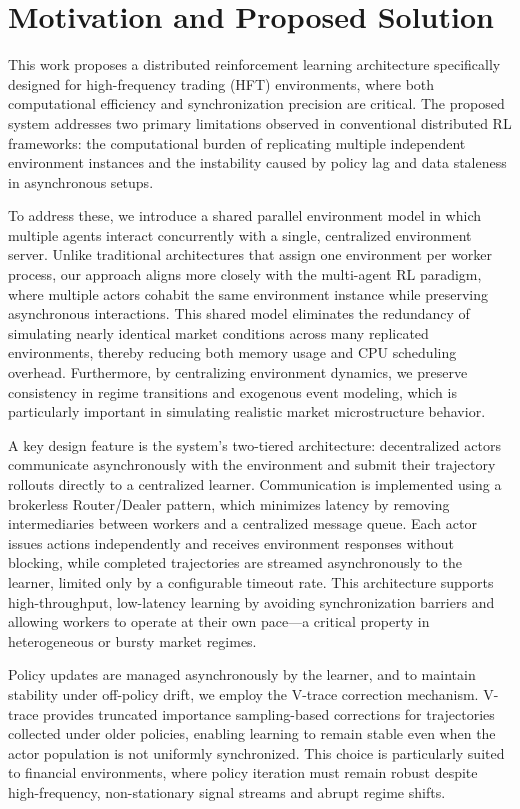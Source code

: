 \section{Motivation and Proposed Solution}
\label{sec:motivation}

This work proposes a distributed reinforcement learning architecture specifically designed for high-frequency trading (HFT) environments,
where both computational efficiency and synchronization precision are critical.
The proposed system addresses two primary limitations observed in conventional distributed RL frameworks:
the computational burden of replicating multiple independent environment instances and the instability caused by
policy lag and data staleness in asynchronous setups.

To address these, we introduce a shared parallel environment model in which multiple agents interact concurrently with a single,
centralized environment server.
Unlike traditional architectures that assign one environment per worker process, our approach aligns more closely with the multi-agent RL paradigm,
where multiple actors cohabit the same environment instance while preserving asynchronous interactions.
This shared model eliminates the redundancy of simulating nearly identical market conditions across many replicated environments,
thereby reducing both memory usage and CPU scheduling overhead.
Furthermore, by centralizing environment dynamics, we preserve consistency in regime transitions and exogenous event modeling,
which is particularly important in simulating realistic market microstructure behavior.

A key design feature is the system’s two-tiered architecture: decentralized actors communicate asynchronously
with the environment and submit their trajectory rollouts directly to a centralized learner.
Communication is implemented using a brokerless Router/Dealer pattern, which minimizes latency by
removing intermediaries between workers and a centralized message queue.
Each actor issues actions independently and receives environment responses without blocking,
while completed trajectories are streamed asynchronously to the learner, limited only by a configurable timeout rate.
This architecture supports high-throughput, low-latency learning by avoiding synchronization barriers and
allowing workers to operate at their own pace—a critical property in heterogeneous or bursty market regimes.

Policy updates are managed asynchronously by the learner, and to maintain stability under off-policy drift,
we employ the V-trace correction mechanism.
V-trace provides truncated importance sampling-based corrections for trajectories collected under older policies,
enabling learning to remain stable even when the actor population is not uniformly synchronized.
This choice is particularly suited to financial environments, where policy iteration must remain robust despite high-frequency,
non-stationary signal streams and abrupt regime shifts.

